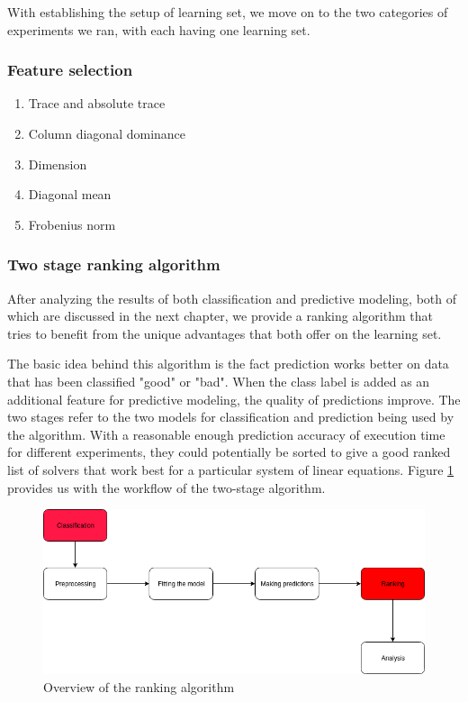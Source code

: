 With establishing the setup of learning set, we move on to the two categories of experiments we ran, with each having one learning set.

\subsubsection{Feature selection}

\begin{enumerate}
    \item Trace and absolute trace
    \item Column diagonal dominance
    \item Dimension
    \item Diagonal mean
    \item Frobenius norm
\end{enumerate}

\subsubsection{Two stage ranking algorithm}
After analyzing the results of both classification and predictive modeling, both of which are discussed in the next chapter, we provide a ranking algorithm that tries to benefit from the unique advantages that both offer on the learning set. 



The basic idea behind this algorithm is the fact prediction works better on data that has been classified "good" or "bad". When the class label is added as an additional feature for predictive modeling, the quality of predictions improve. The two stages refer to the two models for classification and prediction being used by the algorithm. With a reasonable enough prediction accuracy of execution time for different experiments, they could potentially be sorted to give a good ranked list of solvers that work best for a particular system of linear equations. Figure \ref{Overview of the ranking algorithm} provides us with the workflow of the two-stage algorithm.


\begin{figure}
    \centering
    \includegraphics[width=1\columnwidth]{figures/ranking_overview.png}
    \caption{Overview of the ranking algorithm}
    \label{Overview of the ranking algorithm}
\end{figure}

